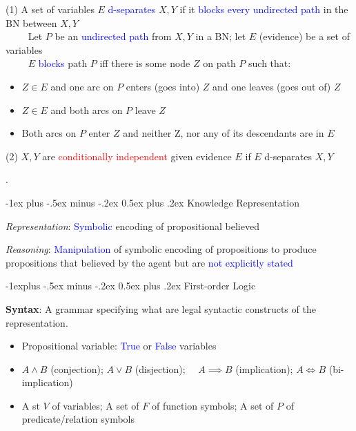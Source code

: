 \documentclass[7pt,landscape]{article}
\makeatletter
\renewcommand{\section}{\@startsection{section}{1}{0mm}%
                                {-1ex plus -.5ex minus -.2ex}%
                                {0.5ex plus .2ex}%
                                {\normalfont\large\bfseries}}
\renewcommand{\subsection}{\@startsection{subsection}{2}{0mm}%
                                {-1explus -.5ex minus -.2ex}%
                                {0.5ex plus .2ex}%
                                {\normalfont\normalsize\bfseries}}
\makeatother
\begin{document}
\begin{multicols}{2}
(1) A set of variables $E$ \textcolor{blue}{d-separates} $X, Y$ if it \textcolor{blue}{blocks every undirected path} in the BN between $X, Y$ \\
$\quad \quad$ Let $P$ be an \textcolor{blue}{undirected path} from $X, Y$ in a BN; let $E$ (evidence) be a set of variables \\
$\quad \quad$ $E$ \textcolor{blue}{blocks} path $P$ iff there is some node $Z$ on path $P$ such that:
\begin{itemize}
    \item $Z \in E$ and one arc on $P$ enters (goes into) $Z$ and one leaves (goes out of) $Z$
    \item $Z \in E$ and both arcs on $P$ leave $Z$
    \item Both arcs on $P$ enter $Z$ and neither Z, nor any of its descendants are in $E$
\end{itemize}

(2) $X, Y$ are \textcolor{red}{conditionally independent} given evidence $E$ if $E$ d-separates $X, Y$

\vspace*{220px}

.


\section{Knowledge Representation}

\textit{Representation}: \textcolor{blue}{Symbolic} encoding of propositional believed 

\textit{Reasoning}: \textcolor{blue}{Manipulation} of symbolic encoding of propositions to produce propositions that believed by the agent but are \textcolor{blue}{not explicitly stated}

\subsection{First-order Logic}

\textbf{Syntax}: A grammar specifying what are legal syntactic constructs of the representation.

\begin{itemize}
    \item Propositional variable: \textcolor{blue}{True} or \textcolor{blue}{False} variables
    \item $A \land B$ (conjection); $A \lor B$ (disjection); $\quad A \implies B$ (implication); $A \iff B$ (bi-implication)
    \item A st $V$ of variables; A set of $F$ of function symbols; A set of $P$ of predicate/relation symbols
\end{itemize}


\end{multicols}
\end{document}
